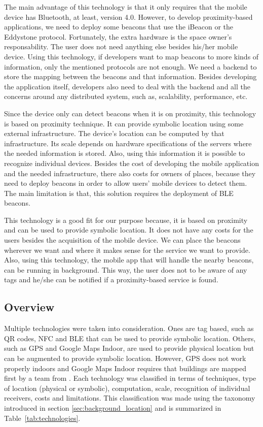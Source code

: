 The main advantage of this technology is that it only requires that the mobile device has Bluetooth, at least, version 4.0.
However, to develop proximity-based applications, we need to deploy some beacons that use the iBeacon or the Eddystone protocol.
Fortunately, the extra hardware is the space owner's responsability.
The user does not need anything else besides his/her mobile device.
Using this technology, if developers want to map beacons to more kinds of information, only the mentioned protocols are not enough.
We need a backend to store the mapping between the beacons and that information.
Besides developing the application itself, developers also need to deal with the backend and all the concerns around any distributed system, such as, scalability, performance, etc.

Since the device only can detect beacons when it is on proximity, this technology is based on proximity technique.
It can provide symbolic location using some external infrastructure.
The device's location can be computed by that infrastructure.
Its scale depends on hardware specifications of the servers where the needed information is stored.
Also, using this information it is possible to recognize individual devices.
Besides the cost of developing the mobile application and the needed infrastructure, there also costs for owners of places, because they need to deploy beacons in order to allow users' mobile devices to detect them.
The main limitation is that, this solution requires the deployment of \gls{BLE} beacons.

This technology is a good fit for our purpose because, it is based on proximity and can be used to provide symbolic location.
It does not have any costs for the users besides the acquisition of the mobile device.
We can place the beacons wherever we want and where it makes sense for the service we want to provide.
Also, using this technology, the mobile app that will handle the nearby beacons, can be running in background.
This way, the user does not to be aware of any tags and he/she can be notified if a proximity-based service is found.

\subsection{Overview}
\label{sub:background_overview}
Multiple technologies were taken into consideration.
Ones are tag based, such as \gls{QR} codes, \gls{NFC} and \gls{BLE} that can be used to provide symbolic location.
Others, such as \gls{GPS} and Google Maps Indoor, are used to provide physical location but can be augmented to provide symbolic location.
However, \gls{GPS} does not work properly indoors and Google Maps Indoor requires that buildings are mapped first by a team from .
Each technology was classified in terms of techniques, type of location (physical or symbolic), computation, scale, recognition of individual receivers, costs and limitations.
This classification was made using the taxonomy introduced in section \ref{sec:background_location} and is summarized in Table~\ref{tab:technologies}.

